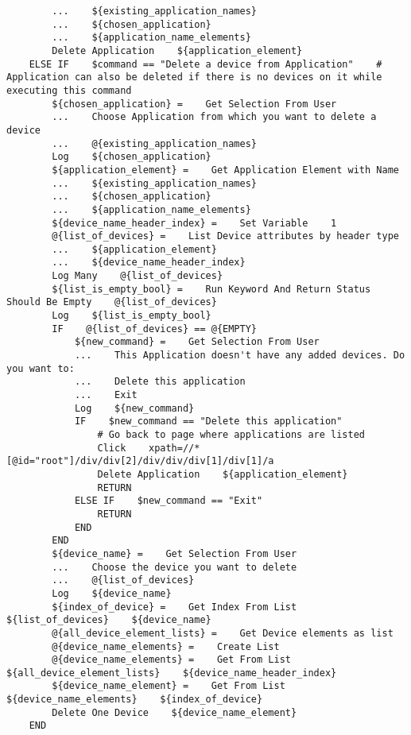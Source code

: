 \begin{verbatim}
        ...    ${existing_application_names}
        ...    ${chosen_application}
        ...    ${application_name_elements}
        Delete Application    ${application_element}
    ELSE IF    $command == "Delete a device from Application"    # Application can also be deleted if there is no devices on it while executing this command
        ${chosen_application} =    Get Selection From User
        ...    Choose Application from which you want to delete a device
        ...    @{existing_application_names}
        Log    ${chosen_application}
        ${application_element} =    Get Application Element with Name
        ...    ${existing_application_names}
        ...    ${chosen_application}
        ...    ${application_name_elements}
        ${device_name_header_index} =    Set Variable    1
        @{list_of_devices} =    List Device attributes by header type
        ...    ${application_element}
        ...    ${device_name_header_index}
        Log Many    @{list_of_devices}
        ${list_is_empty_bool} =    Run Keyword And Return Status    Should Be Empty    @{list_of_devices}
        Log    ${list_is_empty_bool}
        IF    @{list_of_devices} == @{EMPTY}
            ${new_command} =    Get Selection From User
            ...    This Application doesn't have any added devices. Do you want to:
            ...    Delete this application
            ...    Exit
            Log    ${new_command}
            IF    $new_command == "Delete this application"
                # Go back to page where applications are listed
                Click    xpath=//*[@id="root"]/div/div[2]/div/div/div[1]/div[1]/a
                Delete Application    ${application_element}
                RETURN
            ELSE IF    $new_command == "Exit"
                RETURN
            END
        END
        ${device_name} =    Get Selection From User
        ...    Choose the device you want to delete
        ...    @{list_of_devices}
        Log    ${device_name}
        ${index_of_device} =    Get Index From List    ${list_of_devices}    ${device_name}
        @{all_device_element_lists} =    Get Device elements as list
        @{device_name_elements} =    Create List
        @{device_name_elements} =    Get From List    ${all_device_element_lists}    ${device_name_header_index}
        ${device_name_element} =    Get From List    ${device_name_elements}    ${index_of_device}
        Delete One Device    ${device_name_element}
    END


\end{verbatim}
